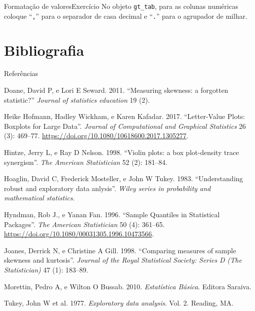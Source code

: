 \documentclass[
  10pt,
  ignorenonframetext,
]{beamer}
\newlength{\cslhangindent}
\newlength{\cslentryspacingunit} %
\newenvironment{CSLReferences}[2] %
 {%
  \setlength{\parindent}{0pt}
  \ifodd #1
  \let\oldpar\par
  \def\par{\hangindent=\cslhangindent\oldpar}
  \fi
  \setlength{\parskip}{#2\cslentryspacingunit}
 }%
 {}
\begin{document}
\begin{frame}[fragile]{Formatação de valores\newline Exercício}
\protect\hypertarget{formatauxe7uxe3o-de-valoresexercuxedcio}{}
No objeto \texttt{gt\_tab}, para as colunas numéricas coloque
``\texttt{,}'' para o separador de casa decimal e ``\texttt{.}'' para o
agrupador de milhar.
\end{frame}

\hypertarget{bibliografia}{%
\section{Bibliografia}\label{bibliografia}}

\begin{frame}{Referências}
\protect\hypertarget{referuxeancias}{}
\small

\hypertarget{refs}{}
\begin{CSLReferences}{1}{0}
\leavevmode{}%
Doane, David P, e Lori E Seward. 2011. {``Measuring skewness: a
forgotten statistic?''} \emph{Journal of statistics education} 19 (2).

\leavevmode{}%
Heike Hofmann, Hadley Wickham, e Karen Kafadar. 2017. {``Letter-Value
Plots: Boxplots for Large Data''}. \emph{Journal of Computational and
Graphical Statistics} 26 (3): 469--77.
\url{https://doi.org/10.1080/10618600.2017.1305277}.

\leavevmode{}%
Hintze, Jerry L, e Ray D Nelson. 1998. {``Violin plots: a box
plot-density trace synergism''}. \emph{The American Statistician} 52
(2): 181--84.

\leavevmode{}%
Hoaglin, David C, Frederick Mosteller, e John W Tukey. 1983.
{``Understanding robust and exploratory data anlysis''}. \emph{Wiley
series in probability and mathematical statistics}.

\leavevmode{}%
Hyndman, Rob J., e Yanan Fan. 1996. {``Sample Quantiles in Statistical
Packages''}. \emph{The American Statistician} 50 (4): 361--65.
\url{https://doi.org/10.1080/00031305.1996.10473566}.

\leavevmode{}%
Joanes, Derrick N, e Christine A Gill. 1998. {``Comparing measures of
sample skewness and kurtosis''}. \emph{Journal of the Royal Statistical
Society: Series D (The Statistician)} 47 (1): 183--89.

\leavevmode{}%
Morettin, Pedro A, e Wilton O Bussab. 2010. \emph{Estatística Básica}.
Editora Saraiva.

\leavevmode{}%
Tukey, John W et al. 1977. \emph{Exploratory data analysis}. Vol. 2.
Reading, MA.

\end{CSLReferences}
\end{frame}
\end{document}
